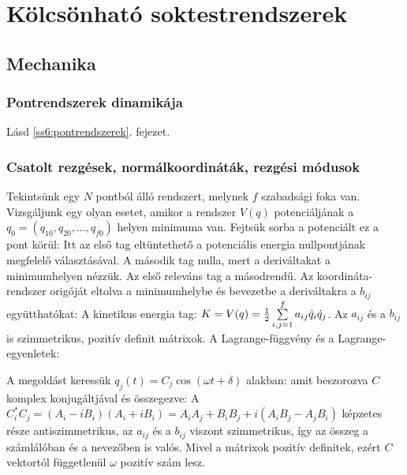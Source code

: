 \chapter{K\"olcs\"onhat\'o soktestrendszerek}
 
 \section{Mechanika} 
  
  \subsection{Pontrendszerek dinamikája}
   
   Lásd \ref{ss6:pontrendszerek}. fejezet. 
   
  \subsection{Csatolt rezgések, normálkoordináták, rezgési módusok}
   
   Tekintsünk egy $N$ pontból álló rendszert, melynek $f$ szabadsági foka van. Vizsgáljunk egy olyan esetet, amikor a rendszer $V(q)$ potenciáljának a $q_0=(q_{10},q_{20},\dots,q_{f0})$ helyen minimuma van. Fejtsük sorba a potenciált ez a pont körül:
   Itt az első tag eltüntethető a potenciális energia nullpontjának megfelelő választásával. A második tag nulla, mert a deriváltakat a minimumhelyen nézzük. Az első releváns tag a másodrendű. Az koordináta-rendszer origóját eltolva a minimumhelybe és bevezetbe a deriváltakra a $b_{ij}$ együtthatókat:
   A kinetikus energia tag: $K=V(q)=\frac{1}{2}\sum\limits_{i,j=1}^{f}a_{ij} \dot{q}_i \dot{q}_j$. Az $a_{ij}$ és a $b_{ij}$ is szimmetrikus, pozitív definit mátrixok. A Lagrange-függvény és a Lagrange-egyenletek:
   
   A megoldást keressük $q_j(t)=C_j\cos(\omega t+\delta)$ alakban:
   amit beszorozva $C$ komplex konjugáltjával és összegezve:
   A $C_i^* C_j=(A_i-iB_i)(A_i+iB_i)=A_iA_j+B_iB_j+i(A_iB_j-A_jB_i)$ képzetes része antiszimmetrikus, az $a_{ij}$ és a $b_{ij}$ viszont szimmetrikus, így az összeg a számlálóban és a nevezőben is valós. Mivel a mátrixok pozitív definitek, ezért $C$ vektortól függetlenül $\omega$ pozitív szám lesz. 
   
